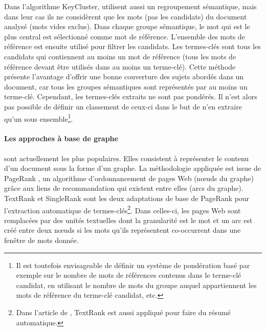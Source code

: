         Dans l'algorithme KeyCluster,   utilisent
        aussi un regroupement sémantique, mais dans leur cas ils ne
        considèrent que les mots (pas les candidats) du document analysé (mots
        vides exclus). Dans chaque groupe sémantique, le mot qui est le plus
        central est sélectionné comme mot de référence. L'ensemble des mots de
        référence est ensuite utilisé pour filtrer les candidats. Les
        termes-clés sont tous les candidats qui contiennent au moins un mot de
        référence (tous les mots de référence devant être utilisés dans au
        moins un terme-clé). Cette méthode présente l'avantage d'offrir une
        bonne couverture des sujets abordés dans un document, car tous les
        groupes sémantiques sont représentés par au moins un terme-clé.
        Cependant, les termes-clés extraits ne sont pas pondérés. Il n'est
        alors pas possible de définir un classement de ceux-ci dans le but de
        n'en extraire qu'un sous ensemble\footnote{Il est toutefois
        envisageable de définir un système de pondération basé par exemple sur
        le nombre de mots de références contenus dans le terme-clé candidat,
        en  utilisant le nombre de mots du groupe auquel appartiennent les
        mots de référence du terme-clé candidat, etc.}.

      \paragraph{Les approches à base de graphe}
        sont actuellement les plus populaires. Elles consistent à représenter
        le contenu d'un document sous la forme d'un graphe. La méthodologie
        appliquée est issue de PageRank \cite{brin1998pagerank}, un
        algorithme d'ordonnancement de pages Web (n\oe{}uds du graphe) grâce
        aux liens de recommandation qui existent entre elles (arcs du graphe).
        TextRank \cite{mihalcea2004textrank} et SingleRank
        \cite{wan2008expandrank} sont les deux adaptations de base de
        PageRank pour l'extraction automatique de termes-clés\footnote{Dans
        l'article de , TextRank est aussi appliqué
        pour faire du résumé automatique.}. Dans celles-ci, les pages Web sont
        remplacées par des unités textuelles dont la granularité est le mot et
        un arc est créé entre deux n\oe{}uds si les mots qu'ils représentent
        co-occurrent dans une fenêtre de mots donnée.
      
